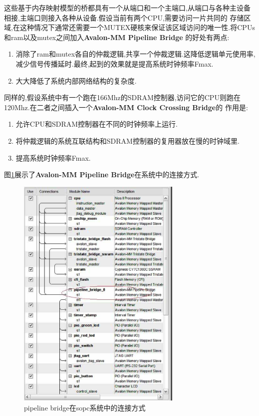 \documentclass[12pt,a4paper,titlepage]{article}
\begin{document}
这些基于内存映射模型的桥都具有一个从端口和一个主端口,从端口与各种主设备相接,主端口则接入各种从设备.假设当前有两个CPU,需要访问一片共同的
存储区域,在这种情况下通常还需要一个MUTEX硬核来保证该区域访问的唯一性.将CPUs和ram以及mutex之间加入\textbf{Avalon-MM Pipeline Bridge}
的好处有两点:
\begin{enumerate}
\item 消除了ram和mutex各自的仲裁逻辑,共享一个仲裁逻辑.这降低逻辑单元使用率,减少信号传播延时.最终,起到的效果就是提高系统时钟频率Fmax.
\item 大大降低了系统内部网络结构的复杂度.
\end{enumerate}

同样的,假设系统中有一个跑在166Mhz的SDRAM控制器,访问它的CPU则跑在120Mhz.在二者之间插入一个\textbf{Avalon-MM Clock Crossing Bridge}的
作用是:
\begin{enumerate}
\item 允许CPU和SDRAM控制器在不同的时钟频率上运行.
\item 将仲裁逻辑的系统互联结构和SDRAM控制器的复用器放在慢的时钟域里.
\item 提高系统时钟频率Fmax.
\end{enumerate}

图\ref{f_ppl}展示了\textbf{Avalon-MM Pipeline Bridge}在系统中的连接方式.
\begin{figure}[!bhtp]
\centering
\includegraphics[width=0.7\textwidth]{pic/f_sopc_pipeline_bridge.eps}
\caption{pipeline bridge在sopc系统中的连接方式\label{f_ppl}}
\end{figure}
\end{document}

